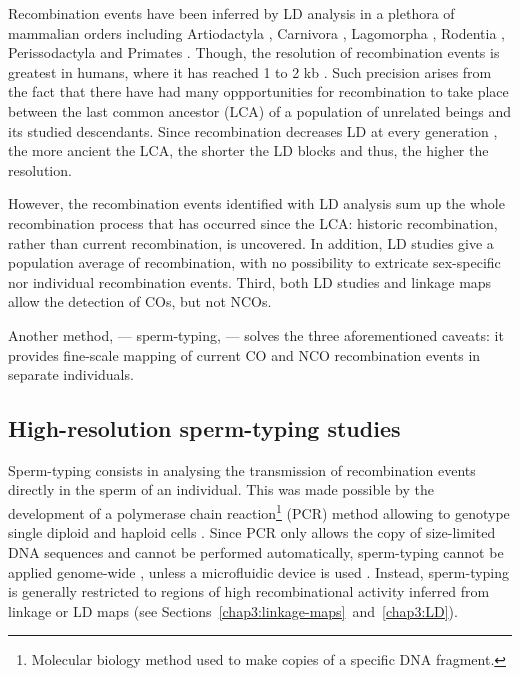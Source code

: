 Recombination events have been inferred by LD analysis in a plethora of mammalian orders including Artiodactyla \citep{farnir2000extensive,mcrae2002linkage,nsengimana2004linkage}, Carnivora \citep{menotti-raymond1999genetic,sutter2004extensive,verardi2006detecting}, Lagomorpha \citep{carneiro2011genetic}, Rodentia \citep{brunschwig2012finescale}, Perissodactyla \citep{corbin2010linkage, mccue2012high} and Primates \citep{auton2012finescale}.
Though, the resolution of recombination events is greatest in humans, where it has reached 1 to 2 kb \citep{theinternationalhapmapconsortium2007seconda, hinch2011landscape, the1000genomesprojectconsortium2015global}.
Such precision arises from the fact that there have had many oppportunities for recombination to take place between the last common ancestor (LCA) of a population of unrelated beings and its studied descendants.
Since recombination decreases LD at every generation \citep{slatkin2008linkage}, the more ancient the LCA, the shorter the LD blocks and thus, the higher the resolution.

However, the recombination events identified with LD analysis sum up the whole recombination process that has occurred since the LCA\@: historic recombination, rather than current recombination, is uncovered.
In addition, LD studies give a population average of recombination, with no possibility to extricate sex-specific nor individual recombination events.
Third, both LD studies and linkage maps allow the detection of COs, but not NCOs.

Another method, — sperm-typing, — solves the three aforementioned caveats: it provides fine-scale mapping of current CO and NCO recombination events in separate individuals.





\subsection{High-resolution sperm-typing studies}%

Sperm-typing consists in analysing the transmission of recombination events directly in the sperm of an individual.
This was made possible by the development of a polymerase chain reaction\footnote{Molecular biology method used to make copies of a specific DNA fragment.} (PCR) method allowing to genotype single diploid and haploid cells \citep{li1988amplification}.
Since PCR only allows the copy of size-limited DNA sequences and cannot be performed automatically, sperm-typing cannot be applied genome-wide \citep{coop2008highresolution}, unless a microfluidic device is used \citep{fan2011wholegenome,wang2012genomewide}.
Instead, sperm-typing is generally restricted to regions of high recombinational activity inferred from linkage or LD maps (see Sections~\ref{chap3:linkage-maps}~and~\ref{chap3:LD}).\\

